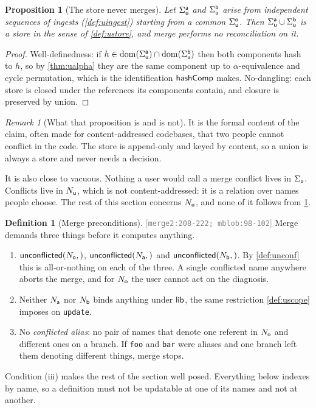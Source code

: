 \documentclass[11pt]{article}
\theoremstyle{definition}
\newtheorem{definition}{Definition}[section]
\theoremstyle{plain}
\newtheorem{proposition}{Proposition}[section]
\theoremstyle{remark}
\newtheorem{remark}{Remark}[section]
\newcommand{\src}[1]{{\footnotesize\textcolor{gray}{[\texttt{#1}]}}}
\begin{document}
\begin{proposition}[The store never merges]\label{prop:merge-store}
Let $\Sigma_{\mathsf{u}}^{\mathsf{a}}$ and $\Sigma_{\mathsf{u}}^{\mathsf{b}}$ arise from independent sequences of ingests
(\cref{def:uingest}) starting from a common $\Sigma_{\mathsf{u}}^{\mathsf{o}}$. Then
$\Sigma_{\mathsf{u}}^{\mathsf{a}} \cup \Sigma_{\mathsf{u}}^{\mathsf{b}}$ is a store in the sense of \cref{def:ustore}, and
merge performs no reconciliation on it.
\end{proposition}
\begin{proof}
Well-definedness: if $h \in \operatorname{dom}(\Sigma_{\mathsf{u}}^{\mathsf{a}}) \cap \operatorname{dom}(\Sigma_{\mathsf{u}}^{\mathsf{b}})$ then both
components hash to $h$, so by \cref{thm:ualpha} they are the same component up to $\alpha$-equivalence
and cycle permutation, which is the identification $\mathsf{hashComp}$ makes. No-dangling: each store is
closed under the references its components contain, and closure is preserved by union.
\end{proof}

\begin{remark}[What that proposition is and is not]\label{rem:merge-store}
It is the formal content of the claim, often made for content-addressed codebases, that two people
cannot conflict in the code. The store is append-only and keyed by content, so a union is always a
store and never needs a decision.

It is also close to vacuous. Nothing a user would call a merge conflict lives in $\Sigma_{\mathsf{u}}$. Conflicts
live in $N_{\mathsf{u}}$, which is not content-addressed: it is a relation over names people choose. The
rest of this section concerns $N_{\mathsf{u}}$, and none of it follows from \cref{prop:merge-store}.
\end{remark}

\begin{definition}[Merge preconditions]\label{def:mergepre}
\src{merge2:208-222; mblob:98-102} Merge demands three things before it computes anything.
\begin{enumerate}[nosep,label=(\roman*)]
  \item $\mathsf{unconflicted}(N_{\mathsf{o}},)$, $\mathsf{unconflicted}(N_{\mathsf{a}},)$ and $\mathsf{unconflicted}(N_{\mathsf{b}},)$. By \cref{def:unconf} this is
        all-or-nothing on each of the three. A single conflicted name anywhere aborts the merge, and
        for $N_{\mathsf{o}}$ the user cannot act on the diagnosis.
  \item Neither $N_{\mathsf{a}}$ nor $N_{\mathsf{b}}$ binds anything under $\mathsf{lib}$, the same restriction
        \cref{def:uscope} imposes on \texttt{update}.
  \item No \emph{conflicted alias}: no pair of names that denote one referent in $N_{\mathsf{o}}$ and different
        ones on a branch. If \texttt{foo} and \texttt{bar} were aliases and one branch left them
        denoting different things, merge stops.
\end{enumerate}
Condition (iii) makes the rest of the section well posed. Everything below indexes by name, so a
definition must not be updatable at one of its names and not at another.
\end{definition}
\end{document}
